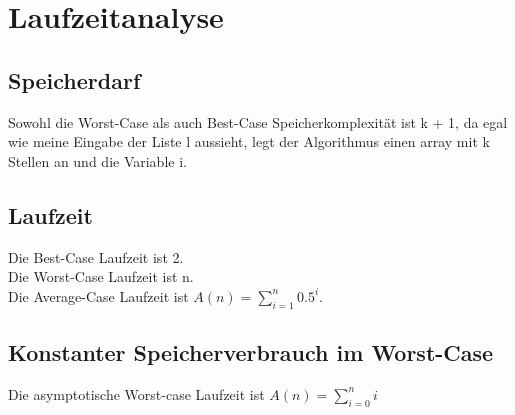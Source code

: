 \section{Laufzeitanalyse}
\subsection{Speicherdarf}
Sowohl die Worst-Case als auch Best-Case Speicherkomplexität ist k + 1, da egal wie meine Eingabe der Liste l aussieht, legt der Algorithmus einen array mit k Stellen an und die Variable i.
\subsection{Laufzeit}
Die Best-Case Laufzeit ist 2.\\
Die Worst-Case Laufzeit ist n.\\
Die Average-Case Laufzeit ist $A(n)= \sum\nolimits_{i=1}^n 0.5^i$.\\
\subsection{Konstanter Speicherverbrauch im Worst-Case}

Die asymptotische Worst-case Laufzeit ist $A(n)=\sum\nolimits_{i=0}^n i$